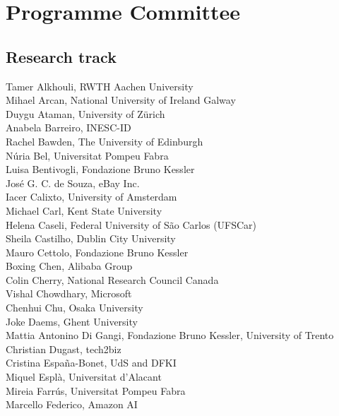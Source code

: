 \documentclass[a4paper,11pt,twoside]{book}
\begin{document}
\pagebreak

\section*{Programme Committee}
\subsection*{Research track}

\noindent Tamer Alkhouli, RWTH Aachen University\\
\noindent Mihael Arcan, National University of Ireland Galway\\
\noindent Duygu Ataman, University of Zürich\\
\noindent Anabela Barreiro, INESC-ID\\
\noindent Rachel Bawden, The University of Edinburgh\\
\noindent Núria Bel, Universitat Pompeu Fabra\\
\noindent Luisa Bentivogli, Fondazione Bruno Kessler\\
\noindent José G. C. de Souza, eBay Inc.\\
\noindent Iacer Calixto, University of Amsterdam\\
\noindent Michael Carl, Kent State University\\
\noindent Helena Caseli, Federal University of São Carlos (UFSCar)\\
\noindent Sheila Castilho, Dublin City University\\
\noindent Mauro Cettolo, Fondazione Bruno Kessler\\
\noindent Boxing Chen, Alibaba Group\\
\noindent Colin Cherry, National Research Council Canada\\
\noindent Vishal Chowdhary, Microsoft\\
\noindent Chenhui Chu, Osaka University\\
\noindent Joke Daems, Ghent University\\
\noindent Mattia Antonino Di Gangi, Fondazione Bruno Kessler, University of Trento\\
\noindent Christian Dugast, tech2biz\\
\noindent Cristina España-Bonet, UdS and DFKI\\
\noindent Miquel Esplà, Universitat d'Alacant\\
\noindent Mireia Farrús, Universitat Pompeu Fabra\\
\noindent Marcello Federico, Amazon AI\\
\end{document}
